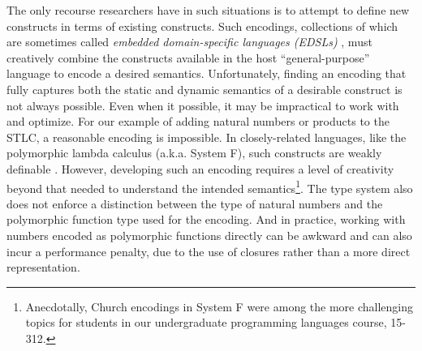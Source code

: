 The only recourse researchers have in such situations is to attempt to define new constructs in terms of existing constructs. Such encodings, collections of which are sometimes called \emph{embedded domain-specific languages (EDSLs)} \cite{fowler2010domain}, must creatively combine the constructs available in the host ``general-purpose'' language to encode a desired semantics. Unfortunately, finding an encoding that fully captures both the static and dynamic semantics of a desirable construct is not always possible. Even when it possible, it may be impractical to work with and optimize. For our example of adding natural numbers or products to the STLC, a reasonable encoding is impossible. In closely-related languages, like the polymorphic lambda calculus (a.k.a. System F), such constructs are weakly definable \cite{reynoldsIntroToPolymorphism}. However, developing such an encoding requires a level of creativity beyond that needed to understand the intended semantics\footnote{Anecdotally, Church encodings in System F were among the more challenging topics for students in our undergraduate programming languages course, 15-312.}. The type system also does not enforce a distinction between the type of natural numbers and the polymorphic function type used for the encoding. And in practice, working with numbers encoded as polymorphic functions directly can be awkward and can also incur a performance penalty, due to the use of closures rather than a more direct representation. 



